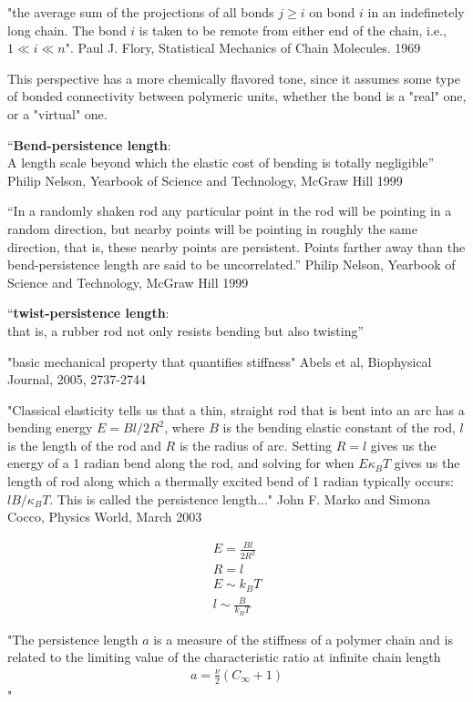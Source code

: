 "the average sum of the projections of all bonds $ j \geq i$  on bond
$i$ in an indefinetely long chain. The bond $i$ is taken to be remote
from either end of the chain, i.e., $1 \ll i \ll n$". Paul J. Flory,
Statistical Mechanics of Chain Molecules. 1969

This perspective has a more chemically flavored tone, since it assumes
some type of bonded  connectivity between polymeric units, whether the
bond is a "real" one, or a "virtual" one.

``\textbf{Bend-persistence length}:\\ 
A length scale beyond which the elastic cost of bending is totally
negligible'' Philip Nelson, Yearbook of Science and Technology, McGraw
Hill 1999

``In a randomly shaken rod any particular point in the rod will be
pointing in a random direction, but nearby points will be pointing in
roughly the same direction, that is, these nearby points are
persistent. Points farther away than the bend-persistence length are
said to be uncorrelated.'' Philip Nelson, Yearbook of Science and
Technology, McGraw Hill 1999

``\textbf{twist-persistence length}:\\
that is, a rubber rod not only resists bending but also twisting''

"basic mechanical property that quantifies stiffness"
Abels et al, Biophysical Journal, 2005, 2737-2744


"Classical elasticity tells us that a thin, straight rod that is bent
into an arc has a bending energy $E=Bl/2R^2$, where $B$ is the bending
elastic constant of the rod, $l$ is the length of the rod and $R$ is
the radius of arc. Setting $R=l$ gives us the energy of a 1 radian
bend along the rod, and solving for when $E \kappa_{B}T$ gives us the
length of rod along which a thermally excited bend of 1 radian
typically occurs: $l B/\kappa_{B}T$. This is called the persistence
length..." John F. Marko and Simona Cocco, Physics World, March 2003



\begin{gather}
E=\frac{Bl}{2R^2}\\
R=l\\
E \sim k_{B}T\\
l \sim \frac{B}{k_{B}T}
\end{gather}  




"The persistence length $a$ is a measure of the stiffness of a polymer
chain and is related to the limiting value of the characteristic ratio
at infinite chain length
\begin{gather}
a=\frac{\nu}{2}(C_{\infty}+1)
\end{gather}
"

